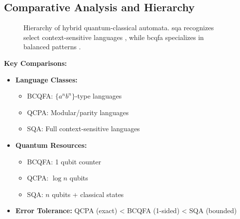 \subsection*{Comparative Analysis and Hierarchy}
\begin{figure}[h]
\centering
{}
\caption{Hierarchy of hybrid quantum-classical automata. \gls{sqa} recognizes select context-sensitive languages \cite{zheng2012two}, while \gls{bcqfa} specializes in balanced patterns \cite{ambainis1998}.}
\label{fig:hybrid-hierarchy}
\end{figure}

\textbf{Key Comparisons:}
\begin{itemize}
    \item \textbf{Language Classes:}
    \begin{itemize}
        \item BCQFA: $\{a^nb^n\}$-type languages
        \item QCPA: Modular/parity languages
        \item SQA: Full context-sensitive languages
    \end{itemize}
    \item \textbf{Quantum Resources:}
    \begin{itemize}
        \item BCQFA: 1 qubit counter
        \item QCPA: $\log n$ qubits
        \item SQA: $n$ qubits + classical states
    \end{itemize}
    \item \textbf{Error Tolerance:} QCPA (exact) < BCQFA (1-sided) < SQA (bounded)
\end{itemize}